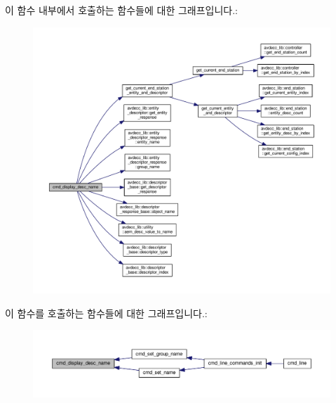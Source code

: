 이 함수 내부에서 호출하는 함수들에 대한 그래프입니다.\+:
\nopagebreak
\begin{figure}[H]
\begin{center}
\leavevmode
\includegraphics[width=350pt]{classcmd__line_a86dc6edfca6ae559b482840c706f7a1a_cgraph}
\end{center}
\end{figure}




이 함수를 호출하는 함수들에 대한 그래프입니다.\+:
\nopagebreak
\begin{figure}[H]
\begin{center}
\leavevmode
\includegraphics[width=350pt]{classcmd__line_a86dc6edfca6ae559b482840c706f7a1a_icgraph}
\end{center}
\end{figure}


